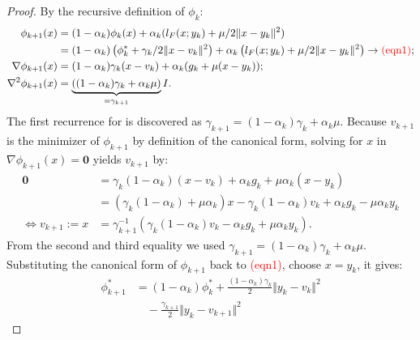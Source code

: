 \documentclass[12pt]{article}
\begin{document}
    \begin{proof}
        By the recursive definition of $\phi_k$: 
        \begin{align*}
            \phi_{k + 1}(x) 
            &= 
            (1 - \alpha_k)\phi_k(x) + \alpha_k (l_F(x; y_k) + \mu/2\Vert x - y_k\Vert^2)
            \\
            &= 
            (1 -\alpha_k)
            \left(
                \phi_k^* + \gamma_k/2\Vert x - v_k\Vert^2
            \right) 
            + 
            \alpha_k
            \left(
                l_F(x; y_k) + \mu/2\Vert x - y_k\Vert^2
            \right)
            \rightarrow \textcolor{red}{(\text{eqn1})}; 
            \\
            \nabla \phi_{k + 1}(x) 
            &= 
            (1 - \alpha_k)\gamma_k(x - v_k) + \alpha_k(g_k + \mu (x - y_k));
            \\
            \nabla^2 \phi_{k + 1}(x) &= 
            \underbrace{((1 - \alpha_k)\gamma_k + \alpha_k \mu)}_{=\gamma_{k + 1}}I. 
        \end{align*}
        The first recurrence for is discovered as $\gamma_{k + 1} = (1 - \alpha_k)\gamma_k + \alpha_k \mu$. 
        Because $v_{k + 1}$ is the minimizer of $\phi_{k+ 1}$ by definition of the canonical form, solving for $x$ in $\nabla \phi_{k + 1}(x) = \mathbf 0$ yields $v_{k + 1}$ by: 
        \begin{align*}
            \mathbf 0 &= 
            \gamma_k(1 - \alpha_k)(x - v_k) + \alpha_k g_k + \mu \alpha_k(x - y_k)
            \\
            &= (\gamma_k(1 - \alpha_k) + \mu \alpha_k)x - 
            \gamma_k(1 - \alpha_k)v_k + \alpha_k g_k - \mu \alpha_k y_k
            \\
            \iff 
            v_{k + 1} := x&=
            \gamma_{k +1}^{-1} 
            \left(
                \gamma_k(1 - \alpha_k) v_k - \alpha_k g_k + \mu \alpha_k y_k
            \right). 
        \end{align*}
        From the second and third equality we used $\gamma_{k + 1} = (1 - \alpha_k)\gamma_k + \alpha_k \mu$. 
        Substituting the canonical form of $\phi_{k + 1}$ back to \textcolor{red}{(eqn1)}, choose $x = y_k$, it gives: 
        \begin{align*}
            \phi_{k + 1}^* 
            &= (1 - \alpha_k)\phi_k^* + \frac{(1 - \alpha_k)\gamma_k}{2}\Vert y_k - v_k\Vert^2   
            \\
            & \quad 
            - \frac{\gamma_{k + 1}}{2}\Vert y_k - v_{k + 1}\Vert^2 

\end{align*}
\end{proof}
\end{document}
